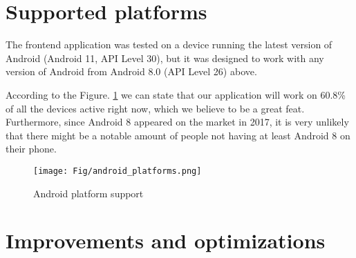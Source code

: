 \documentclass[runningheads,a4paper,11pt]{report}
\begin{document}
\section{Supported platforms}

The frontend application was tested on a device running the latest version of Android (Android 11, API Level 30), but it was designed to work with any version of Android from Android 8.0 (API Level 26) above.

According to the Figure. \ref{fig:androidPlatformSupport} we can state that our application will work on 60.8\% of all the devices active right now, which we believe to be a great feat. Furthermore, since Android 8 appeared on the market in 2017, it is very unlikely that there might be a notable amount of people not having at least Android 8 on their phone.

\begin{figure}[htbp]
	\centerline{\texttt{[image: Fig/android\_platforms.png]}} 
	\caption{Android platform support \cite{Howtofin51:online}}
	\label{fig:androidPlatformSupport}
\end{figure}



\section{Improvements and optimizations}
\end{document}
